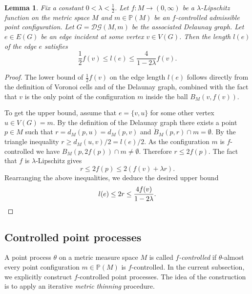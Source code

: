 \documentclass{amsart}
\newcommand{\Points}{\mathbb{P}}
\newcommand{\DelanGraph}{\mathcal{DG}}
\theoremstyle{plain}
\newtheorem{lemma}[theorem]{Lemma}
\numberwithin{equation}{section}
\theoremstyle{definition}
\begin{document}

\begin{lemma}
\label{lemma:lower and upper bound on edges in controlled Delanauy graph}
Fix a constant $0 < \lambda < \tfrac{1}{2}$. Let $f : M \to \left(0,\infty\right)$ be a $\lambda$-Lipschitz  function on the  metric space $M$ and $m \in \Points(M)$ be an $f$-controlled admissible point configuration. Let $G = \DelanGraph(M,m)$ be the  associated Delaunay graph. Let  $e \in E(G)$ be an edge incident at some vertex $v \in V(G)$. Then the length $l(e)$ of the edge $e$ satisfies 
$$\frac{1}{2} f(v) \le l(e) \le \frac{4}{1-2\lambda}f(v).$$
\end{lemma}
\begin{proof}
The lower bound of $\frac{1}{2} f(v)$  on the edge length $l(e)$ follows directly from the definition of Voronoi cells and of the Delaunay graph, combined with the fact that $v $ is the only point of the configuration $m$ inside the ball $B_M(v,f(v))$. 

To get the upper bound, assume that $e = \{v,u\}$ for some other vertex $u \in V(G) = m$. By the definition of the Delaunay graph there exists a point $p \in M$ such that $r=d_M(p,u)=d_M(p,v)$ and $\mathring B_M(p,r)\cap m = \emptyset$.
By the triangle inequality  $r\ge d_M(u,v)/2=l(e)/2$. 
As the configuration $m$ is $f$-controlled we have $B_M(p,2f(p)) \cap m\neq \emptyset$. Therefore $r\le 2 f(p)$.
The fact that $f$ is $\lambda$-Lipschitz gives
$$ r\le 2 f(p)\le  2(f(v) + \lambda r).$$
Rearranging the above inequalities,  we deduce the desired upper bound
$$l(e)\le 2r\le \frac{4 f(v)}{1 -2\lambda}.\qedhere$$
\end{proof}


\subsection{Controlled point processes} 
A point process $\theta$ on a metric measure space $M$ is called \emph{$f$-controlled} if $\theta$-almost every point configuration $m \in \Points(M)$ is $f$-controlled.
In the current subsection, we   explicitly construct $f$-controlled point processes.
The idea of the construction is to apply an iterative \emph{metric thinning} procedure.
\end{document}
